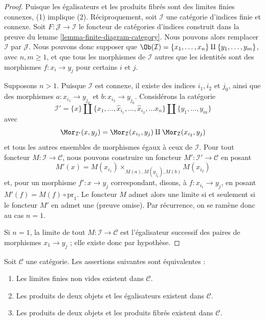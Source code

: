 \begin{proof}
Puisque les égalisateurs et les produits fibrés sont des limites finies
connexes, (1) implique (2). Réciproquement, soit $\mathcal{I}$
une catégorie d'indices finie et connexe. Soit
$F : \mathcal{J} \to \mathcal{I}$
le foncteur de catégories d'indices construit dans la preuve du
lemme \ref{lemma-finite-diagram-category}.
Nous pouvons alors remplacer $\mathcal{I}$ par $\mathcal{J}$.
Nous pouvons donc supposer que
$\Ob(\mathcal{I}) = \{x_1, \ldots, x_n\} \amalg \{y_1, \ldots, y_m\}$,
avec $n, m \geq 1$, et que tous les morphismes de $\mathcal{I}$ autres que les
identités sont des morphismes $f : x_i \to y_j$ pour certains
$i$ et $j$.

\medskip\noindent
Supposons $n > 1$. Puisque $\mathcal{I}$ est connexe, il existe
des indices $i_1, i_2$ et $j_0$, ainsi que des morphismes
$a : x_{i_1} \to y_{j_0}$ et $b : x_{i_2} \to y_{j_0}$.
Considérons la catégorie
$$
\mathcal{I}' =
\{x\} \amalg \{x_1, \ldots, \hat x_{i_1}, \ldots, \hat x_{i_2}, \ldots x_n\}
\amalg \{y_1, \ldots, y_m\}
$$
avec
$$
\Mor_{\mathcal{I}'}(x, y_j) = \Mor_\mathcal{I}(x_{i_1}, y_j)
\amalg \Mor_\mathcal{I}(x_{i_2}, y_j)
$$
et tous les autres ensembles de morphismes égaux à ceux de
$\mathcal{I}$. Pour tout foncteur
$M : \mathcal{I} \to \mathcal{C}$, nous pouvons construire un foncteur
$M' : \mathcal{I}' \to \mathcal{C}$ en posant
$$
M'(x) = M(x_{i_1}) \times_{M(a), M(y_{j_0}), M(b)} M(x_{i_2})
$$
et, pour un morphisme $f' : x \to y_j$ correspondant, disons, à
$f : x_{i_1} \to y_j$, en posant $M'(f) = M(f) \circ \text{pr}_1$.
Le foncteur $M$ admet alors une limite si et seulement si le foncteur
$M'$ en admet une (preuve omise). Par récurrence, on se ramène donc
au cas $n = 1$.

\medskip\noindent
Si $n = 1$, la limite de tout $M : \mathcal{I} \to \mathcal{C}$ est
l'égalisateur successif des paires de morphismes $x_1 \to y_j$ ;
elle existe donc par hypothèse.
\end{proof}

\begin{lemma}
\label{lemma-almost-finite-limits-exist}
Soit $\mathcal{C}$ une catégorie.
Les assertions suivantes sont équivalentes :
\begin{enumerate}
\item Les limites finies non vides existent dans $\mathcal{C}$.
\item Les produits de deux objets et les égalisateurs existent dans
$\mathcal{C}$.
\item Les produits de deux objets et les produits fibrés existent dans
$\mathcal{C}$.
\end{enumerate}
\end{lemma}

